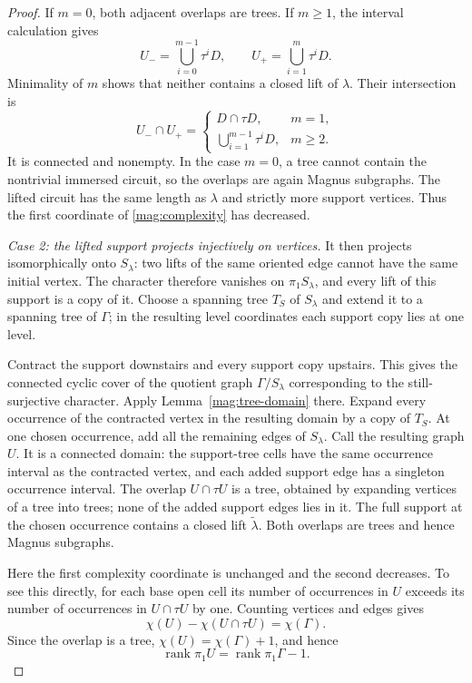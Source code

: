 \begin{proof}
If $m=0$, both adjacent overlaps are trees.  If $m\geq1$, the
interval calculation gives
\[
 U_- =\bigcup_{i=0}^{m-1}\tau^iD,
 \qquad
 U_+ =\bigcup_{i=1}^{m}\tau^iD.
\]
Minimality of $m$ shows that neither contains a closed lift of
$\lambda$.  Their intersection is
\[
 U_-\cap U_+=
 \begin{cases}
   D\cap\tau D,&m=1,\\
   \displaystyle\bigcup_{i=1}^{m-1}\tau^iD,&m\geq2.
 \end{cases}
\]
It is connected and nonempty.  In the case $m=0$, a tree cannot
contain the nontrivial immersed circuit, so the overlaps are
again Magnus subgraphs.
The lifted circuit has the same length as $\lambda$ and strictly
more support vertices.  Thus the first coordinate of
\eqref{mag:complexity} has decreased.

\smallskip\noindent
\emph{Case 2: the lifted support projects injectively on vertices.}
It then projects isomorphically onto $S_\lambda$:
two lifts of the same oriented edge cannot have the same initial
vertex.  The character therefore vanishes on
$\pi_1S_\lambda$, and every lift of this support is a copy of it.
Choose a spanning tree $T_S$ of $S_\lambda$ and extend it to a
spanning tree of $\Gamma$; in the resulting level coordinates
each support copy lies at one level.

Contract the support downstairs and every support copy upstairs.
This gives the connected cyclic cover of the quotient graph
$\Gamma/S_\lambda$ corresponding to the still-surjective
character.  Apply Lemma~\ref{mag:tree-domain} there.
Expand every occurrence of the contracted vertex in the resulting
domain by a copy of $T_S$.  At one chosen occurrence, add all the
remaining edges of $S_\lambda$.
Call the resulting graph $U$.  It is a connected domain:
the support-tree cells have the same occurrence interval as the
contracted vertex, and each added support edge has a singleton
occurrence interval.  The overlap $U\cap\tau U$ is a tree,
obtained by expanding vertices of a tree into trees; none of the
added support edges lies in it.  The full support at the chosen
occurrence contains a closed lift $\widetilde\lambda$.
Both overlaps are trees and hence Magnus subgraphs.

Here the first complexity coordinate is unchanged and the second
decreases.  To see this directly, for each base open cell its
number of occurrences in $U$ exceeds its number of occurrences
in $U\cap\tau U$ by one.  Counting vertices and edges gives
\[
 \chi(U)-\chi(U\cap\tau U)=\chi(\Gamma).
\]
Since the overlap is a tree, $\chi(U)=\chi(\Gamma)+1$, and hence
\[
 \operatorname{rank}\pi_1U
       =\operatorname{rank}\pi_1\Gamma-1.
\]


\end{proof}
